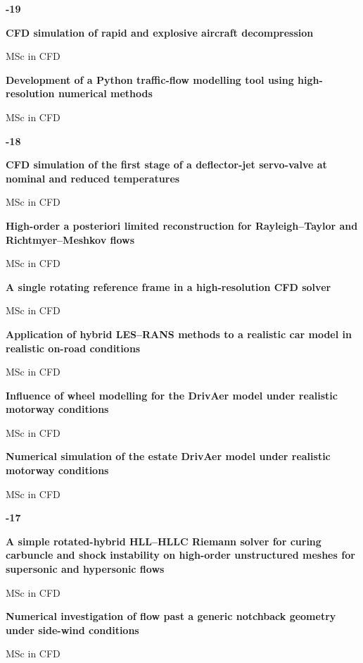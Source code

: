 \documentclass[11pt,a4paper]{article}
\newlength{\cventrysep}
\newenvironment{cventry}{%
  \par\noindent\begin{minipage}{\linewidth}
  \RaggedRight\fontsize{9.8}{12.5}\selectfont
}{\end{minipage}\par\addvspace{\cventrysep}}
\newcommand{\cvtitle}[1]{{\bfseries #1\par}\vspace{1pt}}
\newcommand{\cvmeta}[1]{{\fontsize{9}{11.5}\selectfont\color{Muted}#1\par}\vspace{1pt}}
\newcommand{\cvyear}[1]{{\color{Teal}\bfseries\fontsize{11}{13}\selectfont #1\par}\vspace{6pt}}
\begin{document}
\begin{cventry}
\cvyear{2018-19}
\cvtitle{CFD simulation of rapid and explosive aircraft decompression}
\cvmeta{MSc in CFD}
\end{cventry}

\begin{cventry}
\cvtitle{Development of a Python traffic-flow modelling tool using high-resolution numerical methods}
\cvmeta{MSc in CFD}
\end{cventry}

\begin{cventry}
\cvyear{2017-18}
\cvtitle{CFD simulation of the first stage of a deflector-jet servo-valve at nominal and reduced temperatures}
\cvmeta{MSc in CFD}
\end{cventry}

\begin{cventry}
\cvtitle{High-order a posteriori limited reconstruction for Rayleigh--Taylor and Richtmyer--Meshkov flows}
\cvmeta{MSc in CFD}
\end{cventry}

\begin{cventry}
\cvtitle{A single rotating reference frame in a high-resolution CFD solver}
\cvmeta{MSc in CFD}
\end{cventry}

\begin{cventry}
\cvtitle{Application of hybrid LES--RANS methods to a realistic car model in realistic on-road conditions}
\cvmeta{MSc in CFD}
\end{cventry}

\begin{cventry}
\cvtitle{Influence of wheel modelling for the DrivAer model under realistic motorway conditions}
\cvmeta{MSc in CFD}
\end{cventry}

\begin{cventry}
\cvtitle{Numerical simulation of the estate DrivAer model under realistic motorway conditions}
\cvmeta{MSc in CFD}
\end{cventry}

\begin{cventry}
\cvyear{2016-17}
\cvtitle{A simple rotated-hybrid HLL--HLLC Riemann solver for curing carbuncle and shock instability on high-order unstructured meshes for supersonic and hypersonic flows}
\cvmeta{MSc in CFD}
\end{cventry}

\begin{cventry}
\cvtitle{Numerical investigation of flow past a generic notchback geometry under side-wind conditions}
\cvmeta{MSc in CFD}
\end{cventry}
\end{document}
